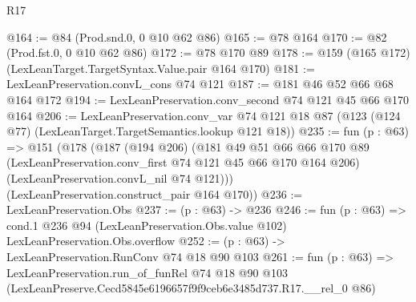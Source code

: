 \begin{lexlean}{R17}
\begin{coremodule}
@164 := @84 (Prod.snd.{0, 0} @10 @62 @86)
@165 := @78 @164
@170 := @82 (Prod.fst.{0, 0} @10 @62 @86)
@172 := @78 @170 @89
@178 := @159 (@165 @172) (LexLeanTarget.TargetSyntax.Value.pair @164 @170)
@181 := LexLeanPreservation.convL_cons @74 @121
@187 := @181 @46 @52 @66 @68 @164 @172
@194 := LexLeanPreservation.conv_second @74 @121 @45 @66 @170 @164
@206 := LexLeanPreservation.conv_var
    @74
    @121
    @18
    @87
    (@123 (@124 @77) (LexLeanTarget.TargetSemantics.lookup @121 @18))
@235 := fun (p : @63) =>
  @151
    (@178
      (@187
        (@194 @206)
        (@181
          @49
          @51
          @66
          @66
          @170
          @89
          (LexLeanPreservation.conv_first @74 @121 @45 @66 @170 @164 @206)
          (LexLeanPreservation.convL_nil @74 @121)))
      (LexLeanPreservation.construct_pair @164 @170))
@236 := LexLeanPreservation.Obs
@237 := (p : @63) -> @236
@246 := fun (p : @63) =>
  cond.{1} @236 @94 (LexLeanPreservation.Obs.value @102) LexLeanPreservation.Obs.overflow
@252 := (p : @63) -> LexLeanPreservation.RunConv @74 @18 @90 @103
@261 := fun (p : @63) =>
  LexLeanPreservation.run_of_funRel
    @74
    @18
    @90
    @103
    (LexLeanPreserve.Cecd5845e6196657f9f9ceb6e3485d737.R17.__rel_0 @86)
\end{coremodule}
\end{lexlean}
